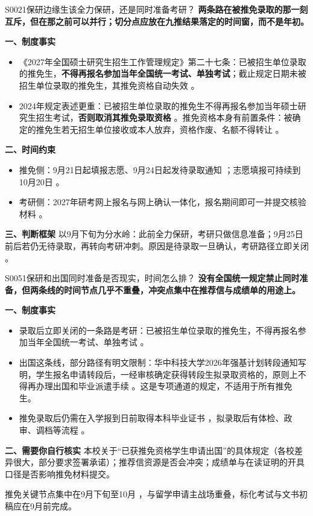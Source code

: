 \begin{qa}{S0021}{保研边缘生该全力保研，还是同时准备考研？}
\textbf{两条路在被推免录取的那一刻互斥，但在那之前可以并行；切分点应放在九推结果落定的时间窗，而不是年初。}

\textbf{一、制度事实}
\begin{itemize}
  \item 《2027年全国硕士研究生招生工作管理规定》第二十七条：已被招生单位录取的推免生，\textbf{不得再报名参加当年全国统一考试、单独考试}；截止规定日期未被招生单位录取的推免生，其推免资格自动失效 。
  \item 2024年规定表述更重：已被招生单位录取的推免生不得再报名参加当年硕士研究生招生考试，\textbf{否则取消其推免录取资格} 。推免资格本身有前置条件：被确定的推免生若无招生单位接收或本人放弃，资格作废、名额不得转让 。
\end{itemize}

\textbf{二、时间约束}
\begin{itemize}
  \item 推免侧：9月21日起填报志愿、9月24日起发待录取通知 ；志愿填报可持续到10月20日 。
  \item 考研侧：2027年研考网上报名与网上确认一体化，报名期间即可一并提交核验材料 。
\end{itemize}

\textbf{三、判断框架}
以9月下旬为分水岭：此前全力保研，考研只做信息准备；9月25日前后若仍无待录取，再转向考研冲刺。原因是待录取一旦确认，考研路径立即关闭 。
\end{qa}

\begin{qa}{S0051}{保研和出国同时准备是否现实，时间怎么排？}
\textbf{没有全国统一规定禁止同时准备，但两条线的时间节点几乎不重叠，冲突点集中在推荐信与成绩单的用途上。}

\textbf{一、制度事实}
\begin{itemize}
  \item 录取后立即关闭的一条路是考研：已被招生单位录取的推免生，不得再报名参加当年全国统一考试、单独考试 。
  \item 出国这条线，部分路径有明文限制：华中科技大学2026年强基计划转段通知写明，学生报名申请转段后，一经审核确定获得转段生拟录取资格的，原则上不得再办理出国和毕业派遣手续 。这是专项通道的规定，不适用于所有推免生。
  \item 推免录取后仍需在入学报到日前取得本科毕业证书 ，拟录取后有体检、政审、调档等流程 。
\end{itemize}

\textbf{二、需要你自行核实}
本校关于“已获推免资格学生申请出国”的具体规定（各校差异很大，部分要求签署承诺）；推荐信资源是否会冲突；成绩单与在读证明的开具口径是否影响推免材料提交。

推免关键节点集中在9月下旬至10月 ，与留学申请主战场重叠，标化考试与文书初稿应在9月前完成。
\end{qa}

